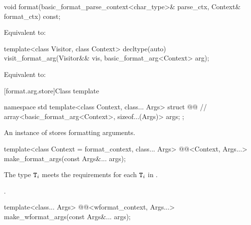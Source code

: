 %
\begin{itemdecl}
void format(basic_format_parse_context<char_type>& parse_ctx, Context& format_ctx) const;
\end{itemdecl}

\begin{itemdescr}
\pnum
\effects
Equivalent to: 
\end{itemdescr}

%
\begin{itemdecl}
template<class Visitor, class Context>
  decltype(auto) visit_format_arg(Visitor&& vis, basic_format_arg<Context> arg);
\end{itemdecl}

\begin{itemdescr}
\pnum
\effects
Equivalent to: 
\end{itemdescr}

[format.arg.store]{Class template }

\begin{codeblock}
namespace std {
  template<class Context, class... Args>
  struct @@ {      // \expos
    array<basic_format_arg<Context>, sizeof...(Args)> args;
  };
}
\end{codeblock}

\pnum
An instance of  stores formatting arguments.

%
\begin{itemdecl}
template<class Context = format_context, class... Args>
  @@<Context, Args...> make_format_args(const Args&... args);
\end{itemdecl}

\begin{itemdescr}
\pnum
\expects
The type
$\texttt{T}_i$\tcode{>}
meets the  requirements
for each $\texttt{T}_i$ in .

\pnum
\returns
{}.
\end{itemdescr}

%
\begin{itemdecl}
template<class... Args>
  @@<wformat_context, Args...> make_wformat_args(const Args&... args);
\end{itemdecl}

